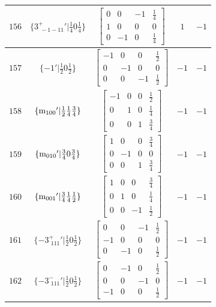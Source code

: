 \documentclass[fleqn,8pt]{jsarticle}
\begin{document}
\begin{longtable}{ccccc}
$ 156 $ & $ \{3^{+}_{\,\,-1-11}{}'|\frac{1}{4} 0 \frac{1}{4}\} $ & $ \begin{bmatrix} 0 & 0 & -1 & \frac{1}{4} \\ 1 & 0 & 0 & 0 \\ 0 & -1 & 0 & \frac{1}{4} \end{bmatrix} $ & $ 1 $ & $ -1 $ \\ \hline
$ 157 $ & $ \{-1{}'|\frac{1}{2} 0 \frac{1}{2}\} $ & $ \begin{bmatrix} -1 & 0 & 0 & \frac{1}{2} \\ 0 & -1 & 0 & 0 \\ 0 & 0 & -1 & \frac{1}{2} \end{bmatrix} $ & $ -1 $ & $ -1 $ \\ \hline
$ 158 $ & $ \{{\rm m}_{100}{}'|\frac{1}{2} \frac{1}{4} \frac{3}{4}\} $ & $ \begin{bmatrix} -1 & 0 & 0 & \frac{1}{2} \\ 0 & 1 & 0 & \frac{1}{4} \\ 0 & 0 & 1 & \frac{3}{4} \end{bmatrix} $ & $ -1 $ & $ -1 $ \\ \hline
$ 159 $ & $ \{{\rm m}_{010}{}'|\frac{3}{4} 0 \frac{3}{4}\} $ & $ \begin{bmatrix} 1 & 0 & 0 & \frac{3}{4} \\ 0 & -1 & 0 & 0 \\ 0 & 0 & 1 & \frac{3}{4} \end{bmatrix} $ & $ -1 $ & $ -1 $ \\ \hline
$ 160 $ & $ \{{\rm m}_{001}{}'|\frac{3}{4} \frac{1}{4} \frac{1}{2}\} $ & $ \begin{bmatrix} 1 & 0 & 0 & \frac{3}{4} \\ 0 & 1 & 0 & \frac{1}{4} \\ 0 & 0 & -1 & \frac{1}{2} \end{bmatrix} $ & $ -1 $ & $ -1 $ \\ \hline
$ 161 $ & $ \{-3^{+}_{\,\,111}{}'|\frac{1}{2} 0 \frac{1}{2}\} $ & $ \begin{bmatrix} 0 & 0 & -1 & \frac{1}{2} \\ -1 & 0 & 0 & 0 \\ 0 & -1 & 0 & \frac{1}{2} \end{bmatrix} $ & $ -1 $ & $ -1 $ \\ \hline
$ 162 $ & $ \{-3^{-}_{\,\,111}{}'|\frac{1}{2} 0 \frac{1}{2}\} $ & $ \begin{bmatrix} 0 & -1 & 0 & \frac{1}{2} \\ 0 & 0 & -1 & 0 \\ -1 & 0 & 0 & \frac{1}{2} \end{bmatrix} $ & $ -1 $ & $ -1 $ \\ \hline

\end{longtable}
\end{document}
